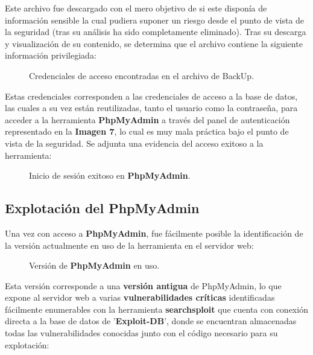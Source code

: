 \documentclass[a4paper]{article} %
\begin{document}
  \clearpage

  Este archivo fue descargado con el mero objetivo de si este disponía de información sensible la cual pudiera suponer un riesgo desde el punto de vista de la seguridad (tras su análisis ha sido completamente eliminado). Tras su descarga y visualización de su contenido, se determina que el archivo contiene la siguiente información privilegiada:

  \begin{figure}[h]
    \centering
    \setlength{\fboxrule}{0.8pt}
    \caption{Credenciales de acceso encontradas en el archivo de BackUp.}
  \end{figure}

  Estas credenciales corresponden a las credenciales de acceso a la base de datos, las cuales a su vez están reutilizadas, tanto el usuario como la contraseña, para acceder a la herramienta \textbf{PhpMyAdmin} a través del panel de autenticación representado en la \textbf{Imagen 7}, lo cual es muy mala práctica bajo el punto de vista de la seguridad. Se adjunta una evidencia del acceso exitoso a la herramienta:

  \vspace{0.2cm}

  \begin{figure}[h]
    \centering
    \setlength{\fboxrule}{0.8pt}
    \caption{Inicio de sesión exitoso en \textbf{PhpMyAdmin}.}
  \end{figure}

  \clearpage
  \subsection{Explotación del PhpMyAdmin}

  Una vez con acceso a \textbf{PhpMyAdmin}, fue fácilmente posible la identificación de la versión actualmente en uso de la herramienta en el servidor web:

  \vspace{0.2cm}

  \begin{figure}[h]
    \centering
    \setlength{\fboxrule}{0.8pt}
    \caption{Versión de \textbf{PhpMyAdmin} en uso.}
  \end{figure}

  \vspace{0.3cm}
  Esta versión corresponde a una \textbf{versión antigua} de PhpMyAdmin, lo que expone al servidor web a varias \textbf{vulnerabilidades críticas} identificadas fácilmente enumerables con la herramienta \textbf{searchsploit} que cuenta con conexión directa a la base de datos de '\textbf{Exploit-DB}', donde se encuentran almacenadas todas las vulnerabilidades conocidas junto con el código necesario para su explotación:
\end{document}
